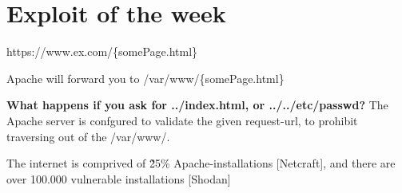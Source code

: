 \section{Exploit of the week}
\begin{flushleft}
https://www.ex.com/\{somePage.html\}

Apache will forward you to /var/www/\{somePage.html\}

\textbf{What happens if you ask for ../index.html, or ../../etc/passwd?}
The Apache server is confgured to validate the given request-url, to prohibit traversing out of the /var/www/.

The internet is comprived of \~25\% Apache-installations [Netcraft], and there are over 100.000 vulnerable installations [Shodan]
\end{flushleft}
